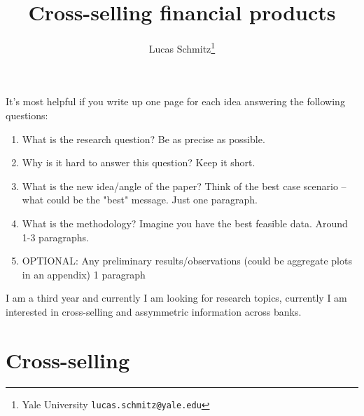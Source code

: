 \documentclass[12pt]{article}
\theoremstyle{plain}
\theoremstyle{plain}
\begin{document}


{\makeatletter
\renewcommand{\@maketitle}{%
  \vspace*{-1cm}%
  \begin{center}%
    {\Large \@title \par}%
    \vskip 1em%
    {\normalsize \@author \par}%
  \end{center}%
  \par
  \vskip 1em}
\makeatother

\title{Cross-selling financial products}
\author{Lucas Schmitz\thanks{Yale University \texttt{lucas.schmitz@yale.edu}}}
\date{}
\maketitle
}

It's most helpful if you write up one page for each idea answering the following questions:
\begin{enumerate}
    \item What is the research question?  Be as precise as possible.
    \item Why is it hard to answer this question?  Keep it short.
    \item What is the new idea/angle of the paper?  Think of the best case scenario -- what could be the "best" message.  Just one paragraph.
    \item What is the methodology?  Imagine you have the best feasible data.  Around 1-3 paragraphs.\item OPTIONAL: Any preliminary results/observations (could be aggregate plots in an appendix)  1 paragraph
\end{enumerate}


\vspace{2cm}
I am a third year and currently I am looking for research topics, currently I am interested in cross-selling and assymmetric information across banks. 

\section*{Cross-selling}
\end{document}
